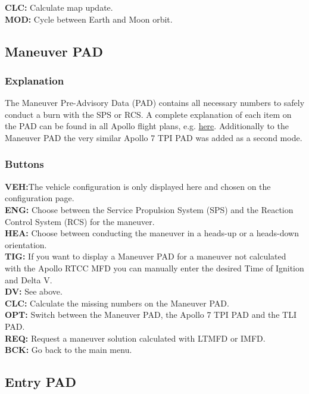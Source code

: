 \documentclass[11pt]{article} %
\begin{document}
\textbf{CLC:} Calculate map update.\\
\textbf{MOD:} Cycle between Earth and Moon orbit.\\

\subsection{Maneuver PAD}

\subsubsection{Explanation}

The Maneuver Pre-Advisory Data (PAD) contains all necessary numbers to safely conduct a burn with the SPS or RCS. A complete explanation of each item on the PAD can be found in all Apollo flight plans, e.g. \href{http://history.nasa.gov/alsj/a11/a11fltpln_final_reformat.pdf}{here}. Additionally to the Maneuver PAD the very similar Apollo 7 TPI PAD was added as a second mode.\\ 

\subsubsection{Buttons}

\textbf{VEH:}The vehicle configuration is only displayed here and chosen on the configuration page.\\
\textbf{ENG:} Choose between the Service Propulsion System (SPS) and the Reaction Control System (RCS) for the maneuver.\\
\textbf{HEA:} Choose between conducting the maneuver in a heads-up or a heads-down orientation.\\
\textbf{TIG:} If you want to display a Maneuver PAD for a maneuver not calculated with the Apollo RTCC MFD you can manually enter the desired Time of Ignition and Delta V.\\
\textbf{DV:} See above.\\
\textbf{CLC:} Calculate the missing numbers on the Maneuver PAD.\\
\textbf{OPT:} Switch between the Maneuver PAD, the Apollo 7 TPI PAD and the TLI PAD.\\
\textbf{REQ:} Request a maneuver solution calculated with LTMFD or IMFD.\\
\textbf{BCK:} Go back to the main menu.\\

\subsection{Entry PAD}
\end{document}
